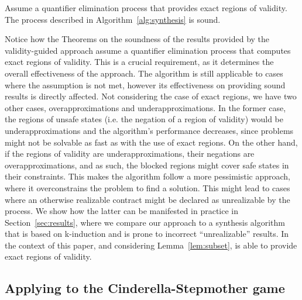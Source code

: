 \begin{corollary}
Assume a quantifier elimination process that provides exact regions of validity. The process described in Algorithm~\ref{alg:synthesis} is sound.
\end{corollary}

Notice how the Theorems on the soundness of the results provided by the validity-guided approach assume a quantifier elimination process that computes exact regions of validity. This is a crucial requirement, as it determines the overall effectiveness of the approach. The algorithm is still applicable to cases where the assumption is not met, however its effectiveness on providing sound results is directly affected. Not considering the case of exact regions, we have two other cases, overapproximations and underapproximations. In the former case, the regions of unsafe states (i.e. the negation of a region of validity) would be underapproximations and the algorithm's performance decreases, since problems might not be solvable as fast as with the use of exact regions. On the other hand, if the regions of validity are underapproximations, their negations are overapproximations, and as such, the blocked regions might cover safe states in their constraints. This makes the algorithm follow a more pessimistic approach, where it overconstrains the problem to find a solution. This might lead to cases where an otherwise realizable contract might be declared as unrealizable by the process. We show how the latter can be manifested in practice in Section~\ref{sec:results}, where we compare our approach to a synthesis algorithm that is based on k-induction and is prone to incorrect ``unrealizable'' results. In the context of this paper, and considering Lemma~\ref{lem:subset}, \aeval is able to provide exact regions of validity.

\subsection{Applying \jsynvg to the Cinderella-Stepmother game}
\label{sec:algexample}

